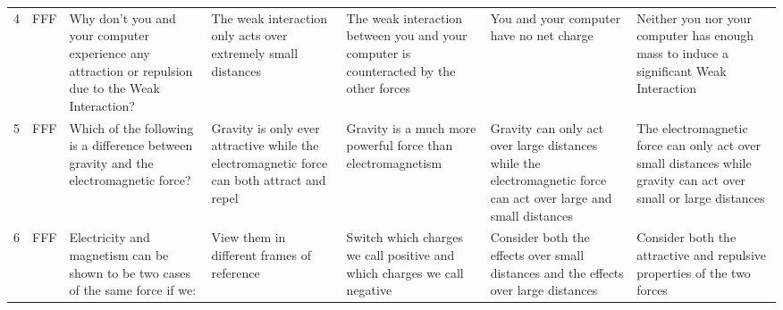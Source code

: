 \documentclass[10pt]{article}
\begin{document}
\begin{tiny}
\begin{longtable}{r P{0.3in} P{1.203in} P{0.8in} P{0.8in} P{0.8in} P{0.8in}}
    4     &     FFF &                                                                                                                                                                              Why don't you and your computer experience any attraction or repulsion due to the Weak Interaction? &                                                                         The weak interaction only acts over extremely small distances &                The weak interaction between you and your computer is counteracted by the other forces &                                                                                   You and your computer have no net charge &                                            Neither you nor your computer has enough mass to induce a significant Weak Interaction \\
    5     &     FFF &                                                                                                                                                                                            Which of the following is a difference between gravity and the electromagnetic force? &                                            Gravity is only ever attractive while the electromagnetic force can both attract and repel &                                           Gravity is a much more powerful force than electromagnetism &           Gravity can only act over large distances while the electromagnetic force can act over large and small distances &                   The electromagnetic force can only act over small distances while gravity can act over small or large distances \\
    6     &     FFF &                                                                                                                                                                                                  Electricity and magnetism can be shown to be two cases of the same force if we: &                                                                                            View them in different frames of reference &                              Switch which charges we call positive and which charges we call negative &                                        Consider both the effects over small distances and the effects over large distances &                                                           Consider both the attractive and repulsive properties of the two forces \\

\end{longtable}
\end{tiny}
\end{document}
